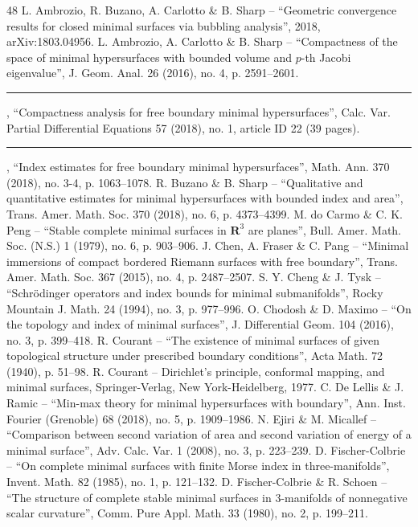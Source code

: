 \documentclass[10pt]{article}
\theoremstyle{definition}\newtheorem{definition}[thm]{Definition}
\numberwithin{equation}{section}
\begin{document}
        	 	
\begingroup\footnotesize
\begin{thebibliography}{48}
 L. Ambrozio, R. Buzano, A. Carlotto \& B. Sharp – “Geometric convergence results for closed minimal surfaces via bubbling analysis”, 2018, arXiv:1803.04956.
 L. Ambrozio, A. Carlotto \& B. Sharp – “Compactness of the space of minimal hypersurfaces with bounded volume and $p$-th Jacobi eigenvalue”, J. Geom. Anal. 26 (2016), no. 4, p. 2591–2601.
 \rule{2em}{.3pt} , “Compactness analysis for free boundary minimal hypersurfaces”, Calc. Var. Partial Diﬀerential Equations 57 (2018), no. 1, article ID 22 (39 pages).
 \rule{2em}{.3pt} , “Index estimates for free boundary minimal hypersurfaces”, Math. Ann. 370 (2018), no. 3-4, p. 1063–1078.
 R. Buzano \& B. Sharp – “Qualitative and quantitative estimates for minimal hypersurfaces with bounded index and area”, Trans. Amer. Math. Soc. 370 (2018), no. 6, p. 4373–4399.
 M. do Carmo \& C. K. Peng – “Stable complete minimal surfaces in $\mathbf{R}^3$ are planes”, Bull. Amer. Math. Soc. (N.S.) 1 (1979), no. 6, p. 903–906.
 J. Chen, A. Fraser \& C. Pang – “Minimal immersions of compact bordered Riemann surfaces with free boundary”, Trans. Amer. Math. Soc. 367 (2015), no. 4, p. 2487–2507.
 S. Y. Cheng \& J. Tysk – “Schrödinger operators and index bounds for minimal submanifolds”, Rocky Mountain J. Math. 24 (1994), no. 3, p. 977–996.
 O. Chodosh \& D. Maximo – “On the topology and index of minimal surfaces”, J. Diﬀerential Geom. 104 (2016), no. 3, p. 399–418.
 R. Courant – “The existence of minimal surfaces of given topological structure under prescribed boundary conditions”, Acta Math. 72 (1940), p. 51–98.
 R. Courant – Dirichlet’s principle, conformal mapping, and minimal surfaces, Springer-Verlag, New York-Heidelberg, 1977.
 C. De Lellis \& J. Ramic – “Min-max theory for minimal hypersurfaces with boundary”, Ann. Inst. Fourier (Grenoble) 68 (2018), no. 5, p. 1909–1986.
 N. Ejiri \& M. Micallef – “Comparison between second variation of area and second variation of energy of a minimal surface”, Adv. Calc. Var. 1 (2008), no. 3, p. 223–239.
 D. Fischer-Colbrie – “On complete minimal surfaces with ﬁnite Morse index in three-manifolds”, Invent. Math. 82 (1985), no. 1, p. 121–132.
 D. Fischer-Colbrie \& R. Schoen – “The structure of complete stable minimal surfaces in $3$-manifolds of nonnegative scalar curvature”, Comm. Pure Appl. Math. 33 (1980), no. 2, p. 199–211.

\end{thebibliography}
\end{document}
